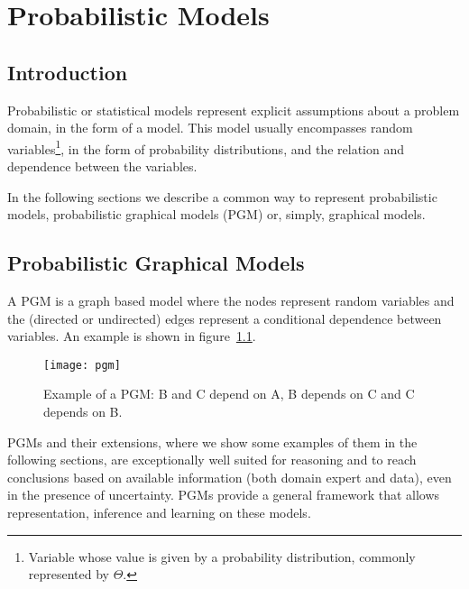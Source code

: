 \chapter{Probabilistic Models} \label{chap:models}

\section*{}

\section{Introduction}

Probabilistic or statistical models represent explicit assumptions about a 
problem domain, in the form of a model. This model usually encompasses random 
variables\footnote{Variable whose value is given by a probability distribution, 
commonly represented by $\Theta$.}, in the form of probability distributions, 
and the relation and dependence between the variables.~\cite{Winn2013}

In the following sections we describe a common way to represent probabilistic models, probabilistic graphical models (PGM) or, simply, graphical models.

\section{Probabilistic Graphical Models}

A PGM is a graph based model where the nodes represent random variables and the 
(directed or undirected) edges represent a conditional dependence between 
variables. An example is shown in figure~\ref{fig:pgm}.

\begin{figure}[h]
	\begin{center}
		\leavevmode
		\texttt{[image: pgm]}
		\caption{Example of a PGM: B and C depend on A, B depends on C and C depends on B. }
		\label{fig:pgm}
	\end{center}
\end{figure}

PGMs and their extensions, where we show some examples of them in the following 
sections, are exceptionally well suited for reasoning and to reach conclusions 
based on available information (both domain expert and data), even in the 
presence of uncertainty. PGMs provide a general framework that allows 
representation, inference and learning on these 
models.~\cite{koller2009probabilistic}

